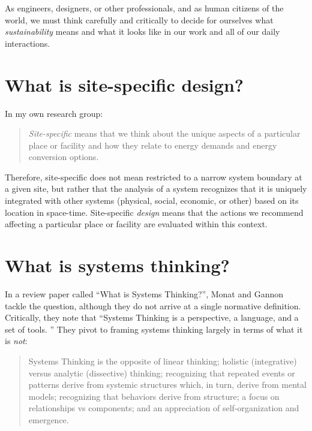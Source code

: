 \documentclass[10pt]{article}
\begin{document}
As engineers, designers, or other professionals, and as human citizens of the world, we must think carefully and critically to decide for ourselves what \textit{sustainability} means and what it looks like in our work and all of our daily interactions.
 
\section{What is site-specific design?}

In my own research group:

\begin{quote}
    \textit{Site-specific} means that we think about the unique aspects of a particular place or facility and how they relate to energy demands and energy conversion options. \cite{SSESresearch}
\end{quote}

Therefore, site-specific does not mean restricted to a narrow system boundary at a given site, but rather that the analysis of a system recognizes that it is uniquely integrated with other systems (physical, social, economic, or other) based on its location in space-time. Site-specific \textit{design} means that the actions we recommend affecting a particular place or facility are evaluated within this context.

\section{What is systems thinking?}

In a review paper called ``What is Systems Thinking?'', Monat and Gannon tackle the question, although they do not arrive at a single normative definition. Critically, they note that ``Systems  Thinking  is  a  perspective,  a  language,  and a set of tools. \cite{Monat2015}'' They pivot to framing systems thinking largely in terms of what it is \textit{not}:

\begin{quotation}
    Systems Thinking is the opposite of linear thinking; holistic (integrative)  versus analytic (dissective)  thinking;  recognizing  that  repeated  events  or  patterns  derive  from  systemic  structures  which,  in  turn,  derive  from  mental  models;  recognizing  that behaviors derive from  structure; a  focus on  relationships  vs  components;  and  an  appreciation of  self-organization  and  emergence. \cite{Monat2015}
\end{quotation}
\end{document}
